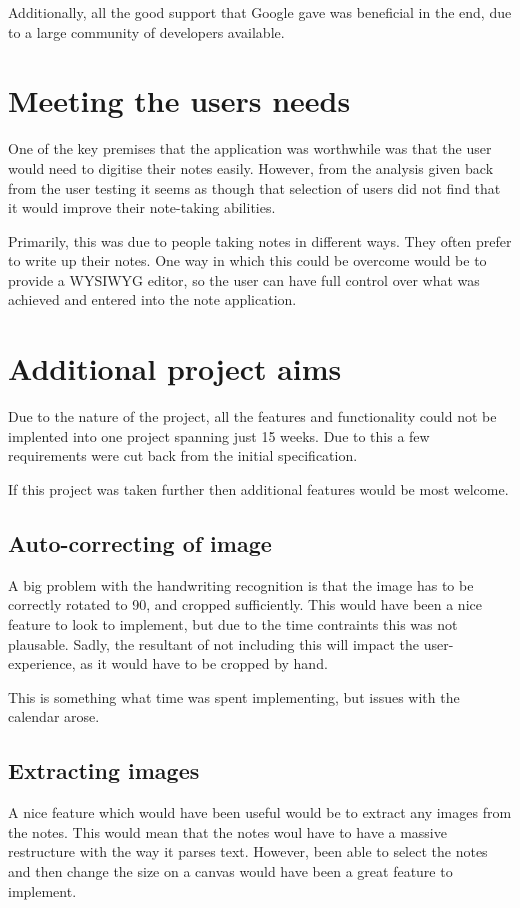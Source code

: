 Additionally, all the good support that Google gave was beneficial in the end, due to a large community of developers available.
\section{Meeting the users needs}
One of the key premises that the application was worthwhile was that the user would need to digitise their notes easily. However, from the analysis given back from the user testing it seems as though that selection of users did not find that it would improve their note-taking abilities.

Primarily, this was due to people taking notes in different ways. They often prefer to write up their notes. One way in which this could be overcome would be to provide a WYSIWYG editor, so the user can have full control over what was achieved and entered into the note application.
\section{Additional project aims}
Due to the nature of the project, all the features and functionality could not be implented into one project spanning just 15 weeks. Due to this a few requirements were cut back from the initial specification.

If this project was taken further then additional features would be most welcome.

\subsection{Auto-correcting of image}
A big problem with the handwriting recognition is that the image has to be correctly rotated to 90\deg, and cropped sufficiently. This would have been a nice feature to look to implement, but due to the time contraints this was not plausable. Sadly, the resultant of not including this will impact the user-experience, as it would have to be cropped by hand.

This is something what time was spent implementing, but issues with the calendar arose.

\subsection{Extracting images}
A nice feature which would have been useful would be to extract any images from the notes. This would mean that the notes woul have to have a massive restructure with the way it parses text. However, been able to select the notes and then change the size on a canvas would have been a great feature to implement.


